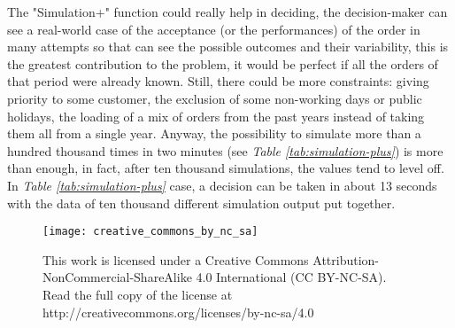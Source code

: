 \documentclass[a4paper,12pt]{article}
\begin{document}
The "Simulation+" function could really help in deciding, the decision-maker can see a real-world case of the acceptance (or the performances) of the order in many attempts so that can see the possible outcomes and their variability, this is the greatest contribution to the problem, it would be perfect if all the orders of that period were already known. Still, there could be more constraints: giving priority to some customer, the exclusion of some non-working days or public holidays, the loading of a mix of orders from the past years instead of taking them all from a single year.  Anyway, the possibility to simulate more than a hundred thousand times in two minutes (see \textit{Table \ref{tab:simulation-plus}}) is more than enough, in fact, after ten thousand simulations, the values tend to level off. In \textit{Table \ref{tab:simulation-plus}} case, a decision can be taken in about 13 seconds with the data of ten thousand different simulation output put together.


\newpage
\thispagestyle{empty}
\begin{figure*}[!b]
	\centering
   	 \texttt{[image: creative\_commons\_by\_nc\_sa]}
	\caption*{This work is licensed under a Creative Commons Attribution-NonCommercial-ShareAlike 4.0 International (CC BY-NC-SA).\\Read the full copy of the license at http://creativecommons.org/licenses/by-nc-sa/4.0}
\end{figure*}
\vspace*{\fill}
\end{document}

